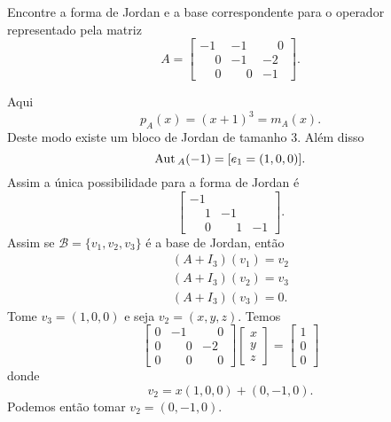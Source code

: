 \begin{enumerate}[label={\arabic*})]
    Encontre a forma de Jordan e a base correspondente para o operador representado pela matriz
    \[
        A = \begin{bmatrix}
            -1 & -1 & \phantom{-}0\\
            \phantom{-}0 & -1 & -2\\
            \phantom{-}0 & \phantom{-}0 & -1
        \end{bmatrix}.
    \]
    \begin{solucao}
    Aqui
    \[
        p_A(x) = (x + 1)^3 = m_A(x).
    \]
    Deste modo existe um bloco de Jordan de tamanho 3. Al\'em disso
    \[
        {\rm Aut\,}_A(-1) = [e_1 = (1,0,0)].
    \]
    Assim a \'unica possibilidade para a forma de Jordan \'e
    \[
        \begin{bmatrix}
            -1 & & \\
            \phantom{-}1 & -1 &\\
            \phantom{-}0 & \phantom{-}1 & -1
        \end{bmatrix}.
    \]
    Assim se $\mathcal{B} = \{v_1, v_2, v_3\}$ \'e a base de Jordan, ent\~ao
    \begin{align*}
        (A + I_3)(v_1) = v_2\\
        (A + I_3)(v_2) = v_3\\
        (A + I_3)(v_3) = 0.
    \end{align*}
    Tome $v_3 = (1,0,0)$ e seja $v_2 = (x,y,z)$. Temos
    \[
        \begin{bmatrix}
            0 & -1 & \phantom{-}0\\
            0 & \phantom{-}0 & -2\\
            0 & \phantom{-}0 & \phantom{-}0
        \end{bmatrix}\begin{bmatrix}
            x\\
            y\\
            z
        \end{bmatrix} = \begin{bmatrix}
            1\\
            0\\
            0
        \end{bmatrix}
    \]
    donde
    \[
        v_2 = x(1,0,0) + (0,-1,0).
    \]
    Podemos ent\~ao tomar $v_2 = (0,-1,0)$.


\end{solucao}
\end{enumerate}
